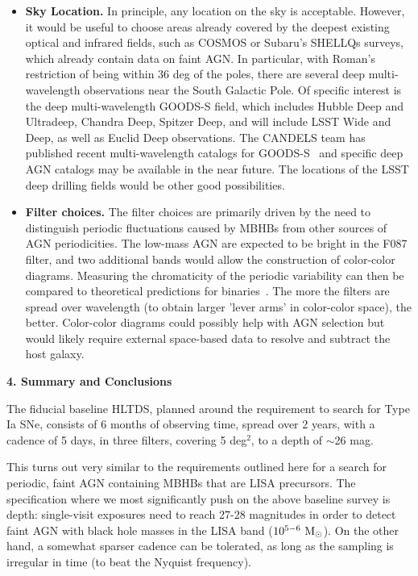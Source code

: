 \documentclass[tightenlines,superscriptaddress,amsmath,amssymb,prl,12pt]{revtex4-1}
\newcommand{\msun}{{\rm M}_\odot}
\begin{document}
\begin{itemize}
\newpage
\item {\bf Sky Location.}  In principle, any location on the sky is
  acceptable.  However, it would be useful to choose areas already
  covered by the deepest existing optical and infrared fields, such as
  COSMOS or Subaru's SHELLQs surveys, which already contain data on
  faint AGN.  In particular, with Roman's restriction of being within
  36 deg of the poles, there are several deep multi-wavelength
  observations near the South Galactic Pole.  Of specific interest is
  the deep multi-wavelength GOODS-S field, which includes Hubble Deep
  and Ultradeep, Chandra Deep, Spitzer Deep, and will include LSST
  Wide and Deep, as well as Euclid Deep observations. The CANDELS team
  has published recent multi-wavelength catalogs for
  GOODS-S~\cite{Barro+2019,Kodra+2023} and specific deep AGN catalogs
  may be available in the near future. The locations of the LSST deep
  drilling fields would be other good possibilities.

\item {\bf Filter choices.}  The filter choices are primarily driven
  by the need to distinguish periodic fluctuations caused by MBHBs
  from other sources of AGN periodicities.  The low-mass AGN are
  expected to be bright in the F087 filter, and two additional bands
  would allow the construction of color-color diagrams.  Measuring the
  chromaticity of the periodic variability can then be compared to
  theoretical predictions for binaries~\cite{Westernacher+2022}. The
  more the filters are spread over wavelength (to obtain larger 'lever
  arms' in color-color space), the better.  Color-color diagrams could
  possibly help with AGN selection but would likely require external
  space-based data to resolve and subtract the host galaxy.


\end{itemize}

\vspace{\baselineskip}
{\bf 4. Summary and Conclusions}
\vspace{0.5\baselineskip}

The fiducial baseline HLTDS, planned around the requirement to search
for Type Ia SNe, consists of 6 months of observing time, spread over 2
years, with a cadence of 5 days, in three filters, covering 5 deg$^2$,
to a depth of $\sim$26 mag.

This turns out very similar to the requirements outlined here for a
search for periodic, faint AGN containing MBHBs that are LISA
precursors.  The specification where we most significantly push on the
above baseline survey is depth: single-visit exposures need to reach
27-28 magnitudes in order to detect faint AGN with black hole masses
in the LISA band ($10^{5-6}~\msun$).  On the other hand, a somewhat
sparser cadence can be tolerated, as long as the sampling is irregular
in time (to beat the Nyquist frequency).
\end{document}

